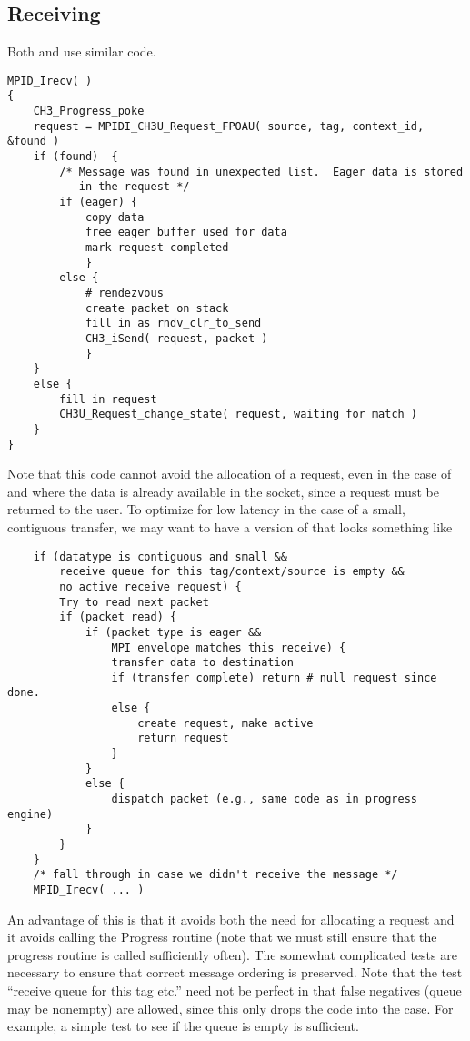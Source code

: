 \documentclass{article}
\begin{document}
\subsection{Receiving}
Both  and  use similar code.

\begin{verbatim}
MPID_Irecv( )
{
    CH3_Progress_poke
    request = MPIDI_CH3U_Request_FPOAU( source, tag, context_id, &found )
    if (found)  {
        /* Message was found in unexpected list.  Eager data is stored
           in the request */
        if (eager) {
            copy data
            free eager buffer used for data
            mark request completed
            }
        else {
            # rendezvous
            create packet on stack
            fill in as rndv_clr_to_send
            CH3_iSend( request, packet )
            }
    }
    else {
        fill in request
        CH3U_Request_change_state( request, waiting for match )
    }
}
\end{verbatim}

Note that this code cannot avoid the allocation of a request, even in
the case of  and where the data is already available in the
socket, since a request must be returned to the user.  To
optimize for low latency in the case of a small, contiguous transfer,
we may want to have a version of  that looks something
like
\begin{verbatim}
    if (datatype is contiguous and small &&
        receive queue for this tag/context/source is empty &&
        no active receive request) {
        Try to read next packet
        if (packet read) {
            if (packet type is eager &&
                MPI envelope matches this receive) {
                transfer data to destination
                if (transfer complete) return # null request since done.
                else {
                    create request, make active
                    return request
                }
            }
            else {
                dispatch packet (e.g., same code as in progress engine)
            }
        } 
    }
    /* fall through in case we didn't receive the message */
    MPID_Irecv( ... )
\end{verbatim}
An advantage of this is that it avoids both the need for allocating a
request and it avoids calling the Progress routine (note that we must
still ensure that the progress routine is called sufficiently often).
The somewhat complicated tests are necessary to ensure that correct message
ordering is preserved. Note that the test ``receive queue for this tag
etc.'' need not be perfect in that false negatives (queue may be
nonempty) are allowed, since this only drops the code into the
 case.  For example, a simple test to see if the
queue is empty is sufficient.
\end{document}

